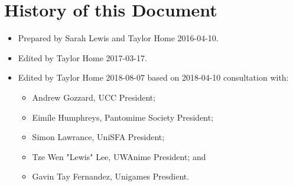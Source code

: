 \documentclass[a4paper]{article}
\begin{document}
\appendixpage

\appendix \section{History of this Document} \label{app:history}

\begin{itemize}
    \item[] Prepared by Sarah Lewis and Taylor Home 2016-04-10.
    \item[] Edited by Taylor Home 2017-03-17.
    \item[] Edited by Taylor Home 2018-08-07 based on 2018-04-10 consultation with:
    \begin{itemize}
        \item Andrew Gozzard, UCC President;
        \item Eim\'ile Humphreys, Pantomime Society President;
        \item Simon Lawrance, UniSFA President;
        \item Tze Wen "Lewis" Lee, UWAnime President; and
        \item Gavin Tay Fernandez, Unigames Presdient.
    \end{itemize}
\end{itemize}
\end{document}
